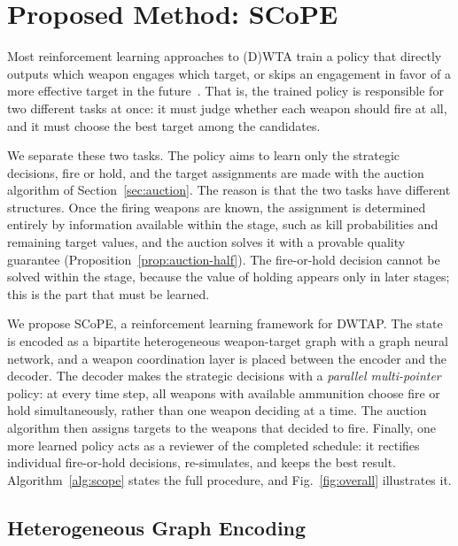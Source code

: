 \section{Proposed Method: SCoPE}
\label{sec:method}

Most reinforcement learning approaches to (D)WTA train a policy that directly outputs which weapon engages which target, or skips an engagement in favor of a more effective target in the future~\cite{na2023weapon,gaudet2023,yoontransformer}. That is, the trained policy is responsible for two different tasks at once: it must judge whether each weapon should fire at all, and it must choose the best target among the candidates.

We separate these two tasks. The policy aims to learn only the strategic decisions, fire or hold, and the target assignments are made with the auction algorithm of Section~\ref{sec:auction}. The reason is that the two tasks have different structures. Once the firing weapons are known, the assignment is determined entirely by information available within the stage, such as kill probabilities and remaining target values, and the auction solves it with a provable quality guarantee (Proposition~\ref{prop:auction-half}). The fire-or-hold decision cannot be solved within the stage, because the value of holding appears only in later stages; this is the part that must be learned.

We propose SCoPE, a reinforcement learning framework for DWTAP. The state is encoded as a bipartite heterogeneous weapon-target graph with a graph neural network, and a weapon coordination layer is placed between the encoder and the decoder. The decoder makes the strategic decisions with a \emph{parallel multi-pointer} policy: at every time step, all weapons with available ammunition choose fire or hold simultaneously, rather than one weapon deciding at a time. The auction algorithm then assigns targets to the weapons that decided to fire. Finally, one more learned policy acts as a reviewer of the completed schedule: it rectifies individual fire-or-hold decisions, re-simulates, and keeps the best result. Algorithm~\ref{alg:scope} states the full procedure, and Fig.~\ref{fig:overall} illustrates it.

\subsection{Heterogeneous Graph Encoding}
\label{sec:encoding}

